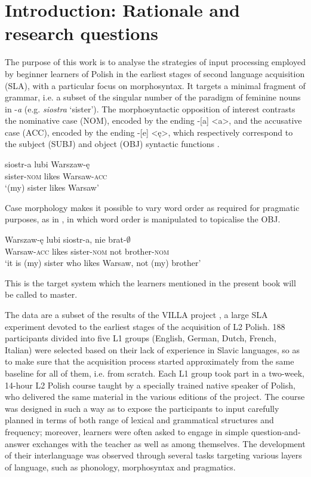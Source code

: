 \chapter{Introduction: Rationale and research questions}\label{sec:1}

The purpose of this work is to analyse the strategies of input processing employed by beginner learners of Polish in the earliest stages of second language acquisition (SLA), with a particular focus on morphosyntax. It targets a minimal fragment of grammar, i.e. a subset of the singular number of the paradigm of feminine nouns in -\textit{a} (e.g. \textit{siostra} ‘sister’). The morphosyntactic opposition of interest contrasts the nominative case (NOM), encoded by the ending -[a] <a>, and the accusative case (ACC), encoded by the ending -[e] <ę>, which respectively correspond to the subject (SUBJ) and object (OBJ) syntactic functions .

\ea%
    \label{ex:01:1}
    \gll    siostr-a 	lubi 	Warszaw-ę\\
            sister-\textsc{nom} likes   Warsaw-\textsc{acc}\\
    \glt    ‘(my) sister likes Warsaw’
    \z

Case morphology makes it possible to vary word order as required for pragmatic purposes, as in , in which word order is manipulated to topicalise the OBJ. 

\ea%
    \label{ex:01:2}
    \gll    Warszaw-ę           lubi   siostr-a,            nie  brat-${\emptyset}$\\
            Warsaw-\textsc{acc} likes  sister-\textsc{nom}  not  brother-\textsc{nom}\\
    \glt    ‘it is (my) sister who likes Warsaw, not (my) brother’
    \z

This is the target system which the learners mentioned in the present book will be called to master. 

The data are a subset of the results of the VILLA project \citep{DimrothEtAl2013}, a large SLA experiment devoted to the earliest stages of the acquisition of L2 Polish. 188 participants divided into five L1 groups (English, German, Dutch, French, Italian) were selected based on their lack of experience in Slavic languages, so as to make sure that the acquisition process started approximately from the same baseline for all of them, i.e. from scratch. Each L1 group took part in a two-week, 14-hour L2 Polish course taught by a specially trained native speaker of Polish, who delivered the same material in the various editions of the project. The course was designed in such a way as to expose the participants to input carefully planned in terms of both range of lexical and grammatical structures and frequency; moreover, learners were often asked to engage in simple question-and-answer exchanges with the teacher as well as among themselves. The development of their interlanguage was observed through several tasks targeting various layers of language, such as phonology, morphosyntax and pragmatics.

